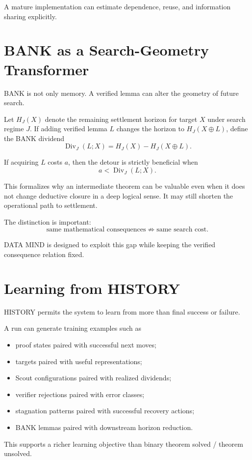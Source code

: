 \documentclass[11pt]{article}
\begin{document}
A mature implementation can estimate dependence, reuse, and information sharing explicitly.

\section{BANK as a Search-Geometry Transformer}

BANK is not only memory. A verified lemma can alter the geometry of future search.

Let $H_J(X)$ denote the remaining settlement horizon for target $X$ under search regime $J$. If adding verified lemma $L$ changes the horizon to $H_J(X\oplus L)$, define the BANK dividend
\[
\operatorname{Div}_J(L;X)
=
H_J(X)-H_J(X\oplus L).
\]

If acquiring $L$ costs $a$, then the detour is strictly beneficial when
\[
a<\operatorname{Div}_J(L;X).
\]

This formalizes why an intermediate theorem can be valuable even when it does not change deductive closure in a deep logical sense. It may still shorten the operational path to settlement.

The distinction is important:
\[
\text{same mathematical consequences}
\not\Rightarrow
\text{same search cost}.
\]

DATA MIND is designed to exploit this gap while keeping the verified consequence relation fixed.

\section{Learning from HISTORY}

HISTORY permits the system to learn from more than final success or failure.

A run can generate training examples such as
\begin{itemize}
\item proof states paired with successful next moves;
\item targets paired with useful representations;
\item Scout configurations paired with realized dividends;
\item verifier rejections paired with error classes;
\item stagnation patterns paired with successful recovery actions;
\item BANK lemmas paired with downstream horizon reduction.
\end{itemize}

This supports a richer learning objective than binary theorem solved / theorem unsolved.
\end{document}
